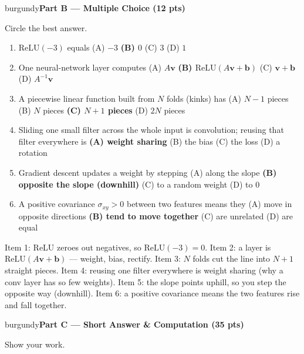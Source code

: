 \documentclass[10pt]{article}
\newcommand{\vv}{\mathbf{v}}
\newcommand{\bb}{\mathbf{b}}
\newcommand{\relu}{\mathrm{ReLU}}
\newcommand{\parthead}[1]{%
  \vspace{6pt}\noindent
  \begin{headlinebox}{burgundy}{\color{white}\bfseries #1}\end{headlinebox}%
  \vspace{4pt}}
\begin{document}
\parthead{Part B --- Multiple Choice (12 pts)}
Circle the best answer.

\begin{enumerate}[leftmargin=1.9em, itemsep=9pt]
  \item $\relu(-3)$ equals
    \hfill (A) $-3$ \quad \textbf{(B) $0$} \ans{$\leftarrow$} \quad (C) $3$ \quad (D) $1$
  \item One neural-network layer computes
    \hfill (A) $A\vv$ \quad \textbf{(B) $\relu(A\vv+\bb)$} \ans{$\leftarrow$} \quad (C) $\vv+\bb$ \quad (D) $A^{-1}\vv$
  \item A piecewise linear function built from $N$ folds (kinks) has
    \hfill (A) $N-1$ pieces \quad (B) $N$ pieces \quad \textbf{(C) $N+1$ pieces} \ans{$\leftarrow$} \quad (D) $2N$ pieces
  \item Sliding one small filter across the whole input is convolution; reusing that filter everywhere is
    \hfill \textbf{(A) weight sharing} \ans{$\leftarrow$} \quad (B) the bias \quad (C) the loss \quad (D) a rotation
  \item Gradient descent updates a weight by stepping
    \hfill (A) along the slope \quad \textbf{(B) opposite the slope (downhill)} \ans{$\leftarrow$} \quad (C) to a random weight \quad (D) to $0$
  \item A positive covariance $\sigma_{xy}>0$ between two features means they
    \hfill (A) move in opposite directions \quad \textbf{(B) tend to move together} \ans{$\leftarrow$} \quad (C) are unrelated \quad (D) are equal
\end{enumerate}

\begin{teachernote}
Item 1: ReLU zeroes out negatives, so $\relu(-3)=0$. Item 2: a layer is $\relu(A\vv+\bb)$ --- weight, bias, rectify.
Item 3: $N$ folds cut the line into $N+1$ straight pieces. Item 4: reusing one filter everywhere is weight sharing
(why a conv layer has so few weights). Item 5: the slope points uphill, so you step the opposite way (downhill).
Item 6: a positive covariance means the two features rise and fall together.
\end{teachernote}

\parthead{Part C --- Short Answer \& Computation (35 pts)}
Show your work.
\end{document}
